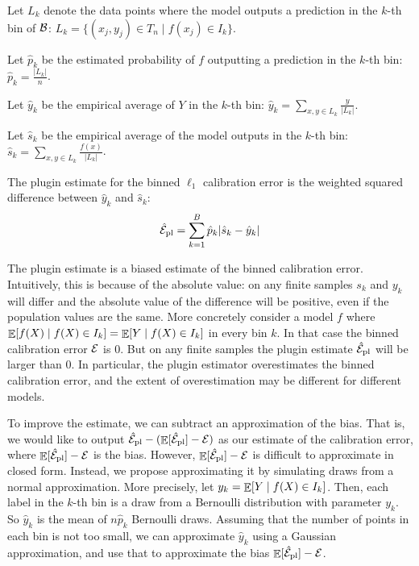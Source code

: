 \begin{definition}
  Let $L_k$ denote the data points where the model outputs a prediction in the $k$-th bin of $\mathcal{B}{}$: $L_k = \{ (x_j, y_j) \in T_n \; | \; f(x_j) \in I_k \}$.
  
  Let $\hat{p}_k$ be the estimated probability of $f$ outputting a prediction in the $k$-th bin:
$\hat{p}_k = \frac{|L_k|}{n}$.

Let $\hat y_k$ be the empirical average of $Y$ in the $k$-th bin: $\hat y_k = \sum_{x, y \in L_k} \frac{y}{|L_k|}$.

Let $\hat s_k$ be the empirical average of the model outputs in the $k$-th bin: $\hat s_k = \sum_{x, y \in L_k} \frac{f(x)}{|L_k|}$.
  
  The plugin estimate for the binned $\ell_1$ calibration error is the weighted squared difference between $\hat y_k$ and $\hat s_k$:
\[ \hat{\mathcal{E}}_{\textup{pl}}{} = \sum_{k=1}^B \hat{p}_k \lvert \hat s_k - \hat y_k \rvert \]
\end{definition}

The plugin estimate is a biased estimate of the binned calibration error. Intuitively, this is because of the absolute value: on any finite samples $s_k$ and $y_k$ will differ and the absolute value of the difference will be positive, even if the population values are the same. More concretely consider a model $f$ where $\mathop{\mathbb{E}}[f(X) \mid f(X) \in I_k] = \mathop{\mathbb{E}}[Y \mid f(X) \in I_k]$ in every bin $k$. In that case the binned calibration error $\mathcal{E}{}$ is $0$. But on any finite samples the plugin estimate $\hat{\mathcal{E}}_{\textup{pl}}{}$ will be larger than $0$. In particular, the plugin estimator overestimates the binned calibration error, and the extent of overestimation may be different for different models.

To improve the estimate, we can subtract an approximation of the bias. That is, we would like to output $\hat{\mathcal{E}}_{\textup{pl}}{} - (\mathop{\mathbb{E}}[\hat{\mathcal{E}}_{\textup{pl}}{}] - \mathcal{E}{})$ as our estimate of the calibration error, where $\mathop{\mathbb{E}}[\hat{\mathcal{E}}_{\textup{pl}}{}] - \mathcal{E}{}$ is the bias. However, $\mathop{\mathbb{E}}[\hat{\mathcal{E}}_{\textup{pl}}{}] - \mathcal{E}{}$ is difficult to approximate in closed form. Instead, we propose approximating it by simulating draws from a normal approximation. More precisely, let $y_k = \mathop{\mathbb{E}}[Y \mid f(X) \in I_k]$. Then, each label in the $k$-th bin is a draw from a Bernoulli distribution with parameter $y_k$. So $\hat y_k$ is the mean of $n \hat p_k$ Bernoulli draws. Assuming that the number of points in each bin is not too small, we can approximate $\hat y_k$ using a Gaussian approximation, and use that to approximate the bias $\mathop{\mathbb{E}}[\hat{\mathcal{E}}_{\textup{pl}}{}] - \mathcal{E}{}$.

